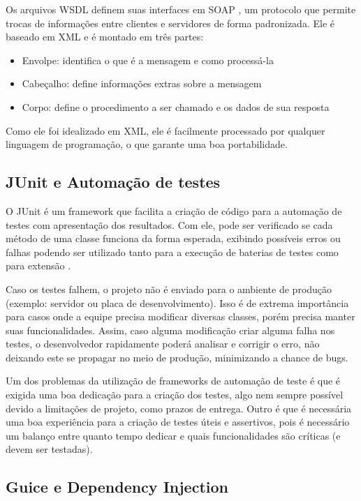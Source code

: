       Os arquivos WSDL definem suas interfaces em SOAP \cite{w3c-spec-soapspec}, um protocolo que permite trocas de informações entre clientes e servidores de forma padronizada. Ele é baseado em XML e é montado em três partes:
      \begin{itemize}
        \item Envolpe: identifica o que é a mensagem e como processá-la
        \item Cabeçalho: define informações extras sobre a mensagem
        \item Corpo: define o procedimento a ser chamado e os dados de sua resposta
      \end{itemize}

      Como ele foi idealizado em XML, ele é facilmente processado por qualquer linguagem de programação, o que garante uma boa portabilidade.

    \subsection{JUnit e Automação de testes}

      O JUnit é um framework que facilita a criação de código para a automação de testes com apresentação dos resultados. Com ele, pode ser verificado se cada método de uma classe funciona da forma esperada, exibindo possíveis erros ou falhas podendo ser utilizado tanto para a execução de baterias de testes como para extensão \cite{wikipedia-junit}.

      Caso os testes falhem, o projeto não é enviado para o ambiente de produção (exemplo: servidor ou placa de desenvolvimento). Isso é de extrema importância para casos onde a equipe precisa modificar diversas classes, porém precisa manter suas funcionalidades. Assim, caso alguma modificação criar alguma falha nos testes, o desenvolvedor rapidamente poderá analisar e corrigir o erro, não deixando este se propagar no meio de produção, minimizando a chance de bugs.

      Um dos problemas da utilização de frameworks de automação de teste é que é exigida uma boa dedicação para a criação dos testes, algo nem sempre possível devido a limitações de projeto, como prazos de entrega. Outro é que é necessária uma boa experiência para a criação de testes úteis e assertivos, pois é necessário um balanço entre quanto tempo dedicar e quais funcionalidades são críticas (e devem ser testadas).

    \subsection{Guice e Dependency Injection}

